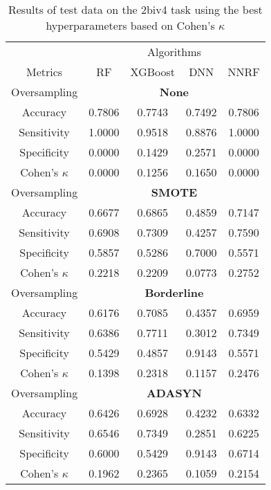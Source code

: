 \begin{table}[!htb]
\centering
\caption{Results of test data on the 2biv4 task using the best hyperparameters based on Cohen's $\kappa$}
\label{tab:2biv4_test_results}
\begin{tabular}{c | c c c c}
\hline
 & \multicolumn{4}{c}{Algorithms}\\ 
Metrics &RF & XGBoost & DNN & NNRF\\ 
\hline
Oversampling &\multicolumn{4}{|c}{\textbf{None}}\\ 
\hline
Accuracy & 0.7806 & 0.7743 & 0.7492 & 0.7806\\ 
Sensitivity & 1.0000 & 0.9518 & 0.8876 & 1.0000\\ 
Specificity & 0.0000 & 0.1429 & 0.2571 & 0.0000\\ 
Cohen's $\kappa$ & 0.0000 & 0.1256 & 0.1650 & 0.0000\\ 
\hline
Oversampling &\multicolumn{4}{|c}{\textbf{SMOTE}}\\ 
\hline
Accuracy & 0.6677 & 0.6865 & 0.4859 & 0.7147\\ 
Sensitivity & 0.6908 & 0.7309 & 0.4257 & 0.7590\\ 
Specificity & 0.5857 & 0.5286 & 0.7000 & 0.5571\\ 
Cohen's $\kappa$ & 0.2218 & 0.2209 & 0.0773 & 0.2752\\ 
\hline
Oversampling &\multicolumn{4}{|c}{\textbf{Borderline}}\\ 
\hline
Accuracy & 0.6176 & 0.7085 & 0.4357 & 0.6959\\ 
Sensitivity & 0.6386 & 0.7711 & 0.3012 & 0.7349\\ 
Specificity & 0.5429 & 0.4857 & 0.9143 & 0.5571\\ 
Cohen's $\kappa$ & 0.1398 & 0.2318 & 0.1157 & 0.2476\\ 
\hline
Oversampling &\multicolumn{4}{|c}{\textbf{ADASYN}}\\ 
\hline
Accuracy & 0.6426 & 0.6928 & 0.4232 & 0.6332\\ 
Sensitivity & 0.6546 & 0.7349 & 0.2851 & 0.6225\\ 
Specificity & 0.6000 & 0.5429 & 0.9143 & 0.6714\\ 
Cohen's $\kappa$ & 0.1962 & 0.2365 & 0.1059 & 0.2154\\ 
\hline
\end{tabular}
\end{table}



